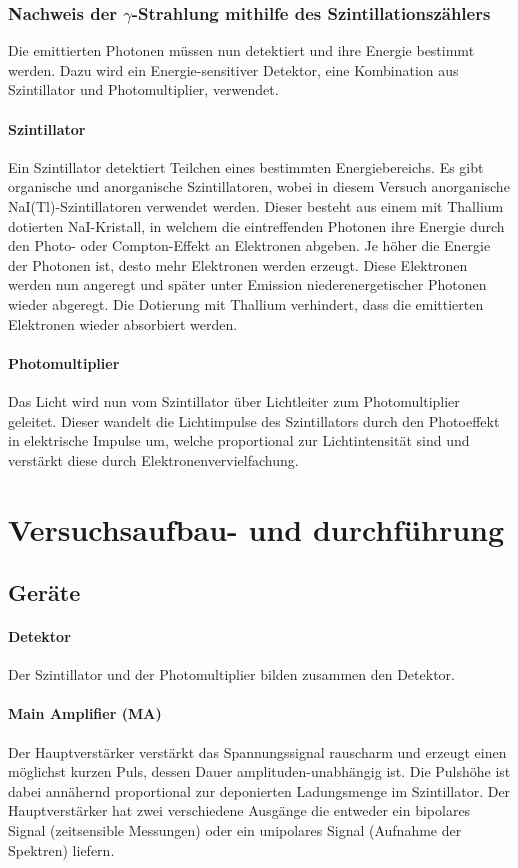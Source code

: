 \documentclass[12pt]{article}
\begin{document}
 \subsubsection{Nachweis der $\gamma$-Strahlung mithilfe des Szintillationszählers}
 Die emittierten Photonen müssen nun detektiert und ihre Energie bestimmt werden. Dazu wird ein Energie-sensitiver Detektor, eine Kombination aus Szintillator und Photomultiplier, verwendet.
 \paragraph{Szintillator} Ein Szintillator detektiert Teilchen eines bestimmten Energiebereichs. Es gibt organische und anorganische Szintillatoren, wobei in diesem Versuch anorganische NaI(Tl)-Szintillatoren verwendet werden. Dieser besteht aus einem mit Thallium dotierten NaI-Kristall, in welchem die eintreffenden Photonen ihre Energie durch den Photo- oder Compton-Effekt an Elektronen abgeben. Je höher die Energie der Photonen ist, desto mehr Elektronen werden erzeugt. Diese Elektronen werden nun angeregt und später unter Emission  niederenergetischer Photonen wieder abgeregt. Die Dotierung mit Thallium verhindert, dass die emittierten Elektronen wieder absorbiert werden.
 \paragraph{Photomultiplier}
 Das Licht wird nun vom Szintillator über Lichtleiter zum Photomultiplier geleitet. Dieser wandelt die Lichtimpulse des Szintillators durch den Photoeffekt in elektrische Impulse um, welche proportional zur Lichtintensität sind und verstärkt diese durch Elektronenvervielfachung.
 

 
\newpage
\section{Versuchsaufbau- und durchführung}
\subsection{Geräte}

\paragraph{Detektor} Der Szintillator und der Photomultiplier bilden zusammen den Detektor.
\paragraph{Main Amplifier (MA)}
Der Hauptverstärker  verstärkt das Spannungssignal rauscharm und erzeugt einen möglichst kurzen Puls, dessen Dauer amplituden-unabhängig ist. Die Pulshöhe ist dabei annähernd proportional zur deponierten Ladungsmenge im Szintillator. Der Hauptverstärker hat zwei verschiedene Ausgänge die entweder ein bipolares Signal (zeitsensible Messungen) oder ein unipolares Signal (Aufnahme der Spektren) liefern.
\end{document}
